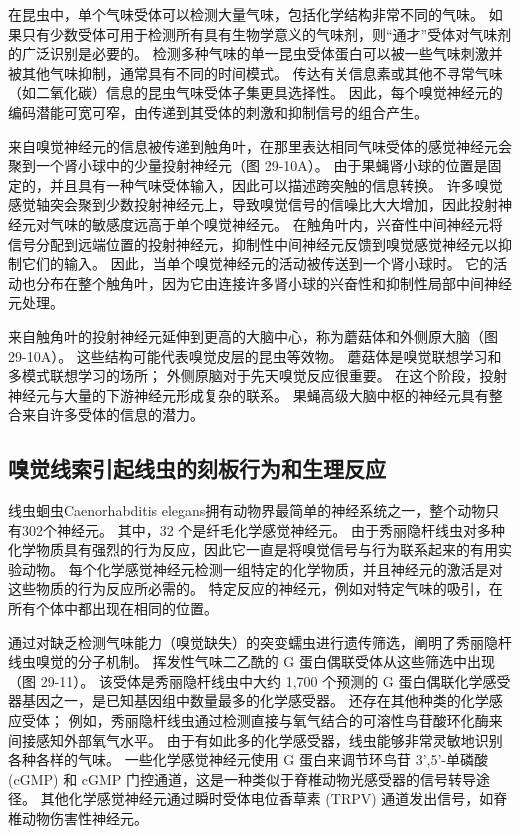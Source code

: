 在昆虫中，单个气味受体可以检测大量气味，包括化学结构非常不同的气味。 如果只有少数受体可用于检测所有具有生物学意义的气味剂，则“通才”受体对气味剂的广泛识别是必要的。 检测多种气味的单一昆虫受体蛋白可以被一些气味刺激并被其他气味抑制，通常具有不同的时间模式。 传达有关信息素或其他不寻常气味（如二氧化碳）信息的昆虫气味受体子集更具选择性。 因此，每个嗅觉神经元的编码潜能可宽可窄，由传递到其受体的刺激和抑制信号的组合产生。

来自嗅觉神经元的信息被传递到触角叶，在那里表达相同气味受体的感觉神经元会聚到一个肾小球中的少量投射神经元（图 29-10A）。 由于果蝇肾小球的位置是固定的，并且具有一种气味受体输入，因此可以描述跨突触的信息转换。 许多嗅觉感觉轴突会聚到少数投射神经元上，导致嗅觉信号的信噪比大大增加，因此投射神经元对气味的敏感度远高于单个嗅觉神经元。 在触角叶内，兴奋性中间神经元将信号分配到远端位置的投射神经元，抑制性中间神经元反馈到嗅觉感觉神经元以抑制它们的输入。 因此，当单个嗅觉神经元的活动被传送到一个肾小球时。 它的活动也分布在整个触角叶，因为它由连接许多肾小球的兴奋性和抑制性局部中间神经元处理。

来自触角叶的投射神经元延伸到更高的大脑中心，称为蘑菇体和外侧原大脑（图 29-10A）。 这些结构可能代表嗅觉皮层的昆虫等效物。 蘑菇体是嗅觉联想学习和多模式联想学习的场所； 外侧原脑对于先天嗅觉反应很重要。 在这个阶段，投射神经元与大量的下游神经元形成复杂的联系。 果蝇高级大脑中枢的神经元具有整合来自许多受体的信息的潜力。


\subsection{嗅觉线索引起线虫的刻板行为和生理反应}
线虫蛔虫Caenorhabditis elegans拥有动物界最简单的神经系统之一，整个动物只有302个神经元。 其中，32 个是纤毛化学感觉神经元。 由于秀丽隐杆线虫对多种化学物质具有强烈的行为反应，因此它一直是将嗅觉信号与行为联系起来的有用实验动物。 每个化学感觉神经元检测一组特定的化学物质，并且神经元的激活是对这些物质的行为反应所必需的。 特定反应的神经元，例如对特定气味的吸引，在所有个体中都出现在相同的位置。

通过对缺乏检测气味能力（嗅觉缺失）的突变蠕虫进行遗传筛选，阐明了秀丽隐杆线虫嗅觉的分子机制。 挥发性气味二乙酰的 G 蛋白偶联受体从这些筛选中出现（图 29-11）。 该受体是秀丽隐杆线虫中大约 1,700 个预测的 G 蛋白偶联化学感受器基因之一，是已知基因组中数量最多的化学感受器。 还存在其他种类的化学感应受体； 例如，秀丽隐杆线虫通过检测直接与氧气结合的可溶性鸟苷酸环化酶来间接感知外部氧气水平。 由于有如此多的化学感受器，线虫能够非常灵敏地识别各种各样的气味。 一些化学感觉神经元使用 G 蛋白来调节环鸟苷 3',5'-单磷酸 (cGMP) 和 cGMP 门控通道，这是一种类似于脊椎动物光感受器的信号转导途径。 其他化学感觉神经元通过瞬时受体电位香草素 (TRPV) 通道发出信号，如脊椎动物伤害性神经元。


